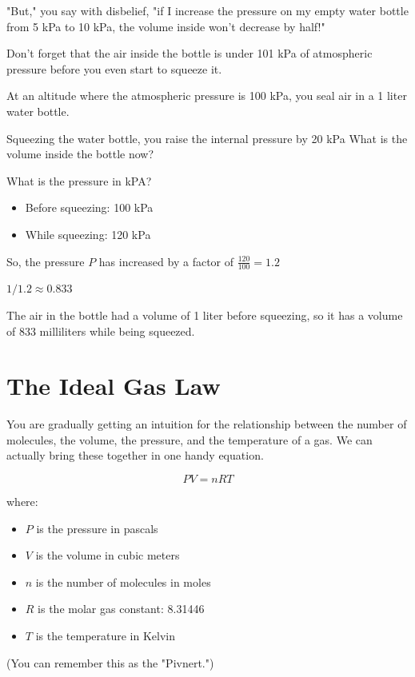 "But," you say with disbelief, "if I increase the pressure on my empty water bottle from 5 kPa to 10 kPa,  the volume inside won't decrease by half!"

Don't forget that the air inside the bottle is under 101 kPa of atmospheric pressure before you even start to squeeze it.

\begin{Exercise}[title={Temperature and Volume},  label=temp_vol]
  
At an altitude where the atmospheric pressure is 100 kPa,  you seal air in a 1 liter water bottle.

Squeezing the water bottle,  you raise the internal pressure by 20 kPa  What is the volume inside the bottle now?

\end{Exercise}
\begin{Answer}[ref=temp_vol]

What is the pressure in kPA?  
\begin{itemize}
\item Before squeezing: 100 kPa
\item While squeezing: 120 kPa
\end{itemize}

So, the pressure $P$ has increased by a factor of $\frac{120}{100} = 1.2$

$1/1.2 \approx 0.833$

The air in the bottle had a volume of 1 liter before squeezing, so it has a volume of 833 milliliters while being squeezed.

\end{Answer}

\section{The Ideal Gas Law}

You are gradually getting an intuition for the relationship between the number of molecules, the volume, the pressure, and the temperature of a gas.
We can actually bring these together in one handy equation.

\begin{mdframed}[style=important, frametitle={Ideal Gas Law}]

$$PV = nRT$$

where:
\begin{itemize}
\item $P$ is the pressure in pascals
\item $V$ is the volume in cubic meters
\item $n$ is the number of molecules in moles
\item $R$ is the molar gas constant: 8.31446
\item $T$ is the temperature in Kelvin
\end{itemize}

(You can remember this as the "Pivnert.")

\end{mdframed}

